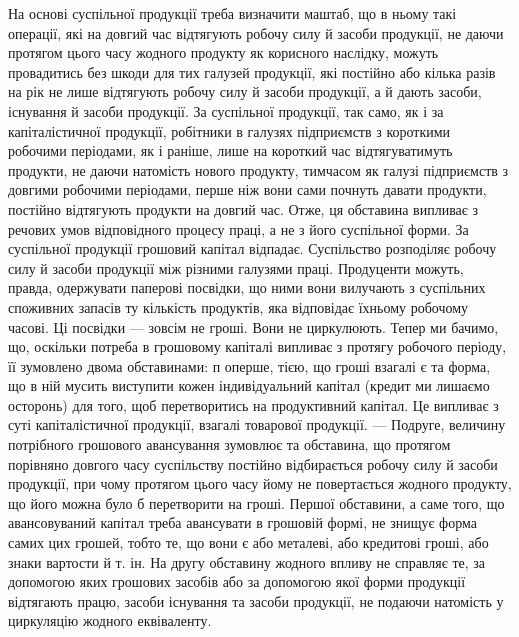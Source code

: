 На основі суспільної продукції треба визначити маштаб, що в ньому
такі операції, які на довгий час відтягують робочу силу й засоби продукції,
не даючи протягом цього часу жодного продукту як корисного
наслідку, можуть провадитись без шкоди для тих галузей продукції, які
постійно або кілька разів на рік не лише відтягують робочу силу й засоби
продукції, а й дають засоби, існування й засоби продукції. За суспільної
продукції, так само, як і за капіталістичної продукції, робітники
в галузях підприємств з короткими робочими періодами, як і раніше, лише
на короткий час відтягуватимуть продукти, не даючи натомість нового
продукту, тимчасом як галузі підприємств з довгими робочими періодами,
перше ніж вони сами почнуть давати продукти, постійно відтягують
продукти на довгий час. Отже, ця обставина випливає з речових
умов відповідного процесу праці, а не з його суспільної форми. За суспільної
продукції грошовий капітал відпадає. Суспільство розподіляє робочу
силу й засоби продукції між різними галузями праці. Продуценти
можуть, правда, одержувати паперові посвідки, що ними вони вилучають
з суспільних споживних запасів ту кількість продуктів, яка відповідає їхньому
робочому часові. Ці посвідки — зовсім не гроші. Вони не циркулюють.
Тепер ми бачимо, що, оскільки потреба в грошовому капіталі випливає
з протягу робочого періоду, її зумовлено двома обставинами: п оперше,
тією, що гроші взагалі є та форма, що в ній мусить виступити
кожен індивідуальний капітал (кредит ми лишаємо осторонь) для того,
щоб перетворитись на продуктивний капітал. Це випливає з суті капіталістичної
продукції, взагалі товарової продукції. — Подруге, величину
потрібного грошового авансування зумовлює та обставина, що протягом
порівняно довгого часу суспільству постійно відбирається робочу силу
й засоби продукції, при чому протягом цього часу йому не повертається
жодного продукту, що його можна було б перетворити на гроші.
Першої обставини, а саме того, що авансовуваний капітал треба авансувати
в грошовій формі, не знищує форма самих цих грошей, тобто те,
що вони є або металеві, або кредитові гроші, або знаки вартости й
т. ін. На другу обставину жодного впливу не справляє те, за допомогою
яких грошових засобів або за допомогою якої форми продукції
відтягають працю, засоби існування та засоби продукції, не подаючи
натомість у циркуляцію жодного еквіваленту.
